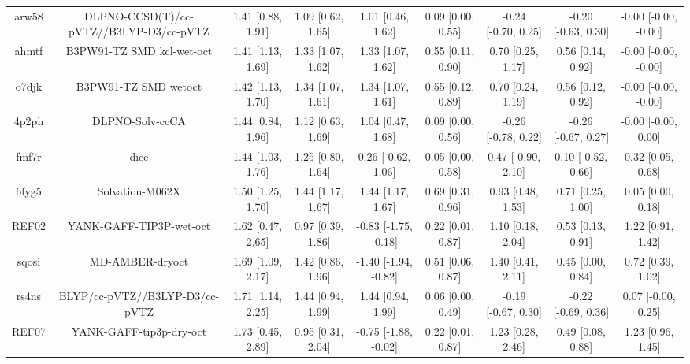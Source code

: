 \documentclass{article}
\begin{document}
\begin{center}
\begin{longtable}{|ccccccccc|}
 arw58 &            DLPNO-CCSD(T)/cc-pVTZ//B3LYP-D3/cc-pVTZ &  1.41 [0.88, 1.91] &  1.09 [0.62, 1.65] &     1.01 [0.46, 1.62] &  0.09 [0.00, 0.55] &  -0.24 [-0.70, 0.25] &  -0.20 [-0.63, 0.30] &  -0.00 [-0.00, -0.00] \\
 ahmtf &                          B3PW91-TZ SMD kcl-wet-oct &  1.41 [1.13, 1.69] &  1.33 [1.07, 1.62] &     1.33 [1.07, 1.62] &  0.55 [0.11, 0.90] &    0.70 [0.25, 1.17] &    0.56 [0.14, 0.92] &  -0.00 [-0.00, -0.00] \\
 o7djk &                               B3PW91-TZ SMD wetoct &  1.42 [1.13, 1.70] &  1.34 [1.07, 1.61] &     1.34 [1.07, 1.61] &  0.55 [0.12, 0.89] &    0.70 [0.24, 1.19] &    0.56 [0.12, 0.92] &  -0.00 [-0.00, -0.00] \\
 4p2ph &                                    DLPNO-Solv-ccCA &  1.44 [0.84, 1.96] &  1.12 [0.63, 1.69] &     1.04 [0.47, 1.68] &  0.09 [0.00, 0.56] &  -0.26 [-0.78, 0.22] &  -0.26 [-0.67, 0.27] &   -0.00 [-0.00, 0.00] \\
 fmf7r &                                               dice &  1.44 [1.03, 1.76] &  1.25 [0.80, 1.64] &    0.26 [-0.62, 1.06] &  0.05 [0.00, 0.58] &   0.47 [-0.90, 2.10] &   0.10 [-0.52, 0.66] &     0.32 [0.05, 0.68] \\
 6fyg5 &                                    Solvation-M062X &  1.50 [1.25, 1.70] &  1.44 [1.17, 1.67] &     1.44 [1.17, 1.67] &  0.69 [0.31, 0.96] &    0.93 [0.48, 1.53] &    0.71 [0.25, 1.00] &     0.05 [0.00, 0.18] \\
 REF02 &                            YANK-GAFF-TIP3P-wet-oct &  1.62 [0.47, 2.65] &  0.97 [0.39, 1.86] &  -0.83 [-1.75, -0.18] &  0.22 [0.01, 0.87] &    1.10 [0.18, 2.04] &    0.53 [0.13, 0.91] &     1.22 [0.91, 1.42] \\
 sqosi &                                    MD-AMBER-dryoct &  1.69 [1.09, 2.17] &  1.42 [0.86, 1.96] &  -1.40 [-1.94, -0.82] &  0.51 [0.06, 0.87] &    1.40 [0.41, 2.11] &    0.45 [0.00, 0.84] &     0.72 [0.39, 1.02] \\
 rs4ns &                     BLYP/cc-pVTZ//B3LYP-D3/cc-pVTZ &  1.71 [1.14, 2.25] &  1.44 [0.94, 1.99] &     1.44 [0.94, 1.99] &  0.06 [0.00, 0.49] &  -0.19 [-0.67, 0.30] &  -0.22 [-0.69, 0.36] &    0.07 [-0.00, 0.25] \\
 REF07 &                            YANK-GAFF-tip3p-dry-oct &  1.73 [0.45, 2.89] &  0.95 [0.31, 2.04] &  -0.75 [-1.88, -0.02] &  0.22 [0.01, 0.87] &    1.23 [0.28, 2.46] &    0.49 [0.08, 0.88] &     1.23 [0.96, 1.45] \\

\end{longtable}
\end{center}
\end{document}
